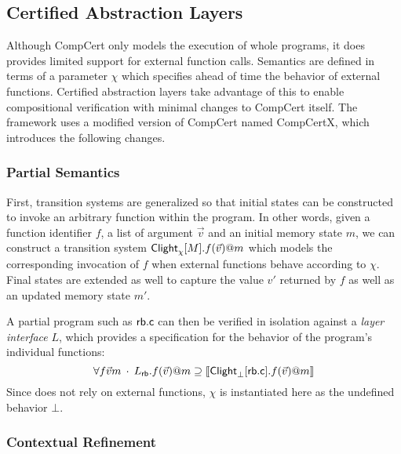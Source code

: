 \documentclass[acmsmall,review,anonymous]{acmart}\settopmatter{printfolios=true,printccs=false,printacmref=false}
\begin{document}

\subsection{Certified Abstraction Layers} \label{sec:mainideas:cal} %

Although CompCert only models the execution of whole programs,
it does provides limited support for external function calls.
Semantics are defined in terms of a parameter $\chi$
which specifies ahead of time the behavior of external functions.
Certified abstraction layers \cite{popl15}
take advantage of this to enable compositional verification
with minimal changes to CompCert itself.
The framework uses a modified version of CompCert named CompCertX,
which introduces the following changes.

\subsubsection{Partial Semantics}

First,
transition systems are generalized so that
initial states can be constructed
to invoke an arbitrary function within the program.
In other words, given
a function identifier $f$,
a list of argument $\vec{v}$ and
an initial memory state $m$,
we can construct a transition system
$ \mathsf{Clight} _\chi[M].f(\vec{v})@m$
which models the corresponding invocation of $f$
when external functions behave according to $\chi$.
Final states are extended as well
to capture the value $v'$ returned by $f$
as well as an updated memory state $m'$.

A partial program such as $ \mathsf{rb.c} $
can then be verified in isolation against a \emph{layer interface} $L$,
which provides a specification for the behavior of the program's individual functions:
\begin{equation} \label{eqn:rbverif}
  \forall f \vec{v} m \:\cdot\:
    L_{ \mathsf{rb} }.f(\vec{v})@m \supseteq
    \llbracket  \mathsf{Clight} _\bot[ \mathsf{rb.c} ].f(\vec{v})@m \rrbracket
\end{equation}
Since  does not rely on external functions,
$\chi$ is instantiated here as the undefined behavior $\bot$.

\subsubsection{Contextual Refinement}
\end{document}
